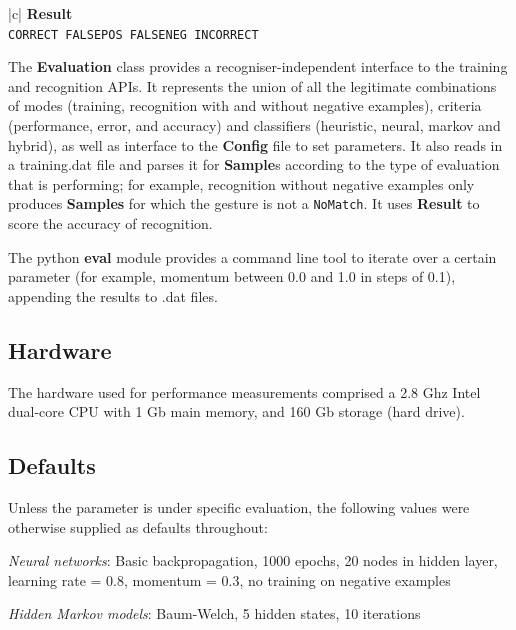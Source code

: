 \documentclass[12pt,a4,notitlepage]{report}
\renewcommand{\_}{\texttt{\symbol{95}}}
\newcommand{\<}{\texttt{\symbol{60}}}
\renewcommand{\>}{\texttt{\symbol{62}}}
\newcommand{\class}[1]{\textbf{#1}}
\newcommand{\variable}[1]{\texttt{#1}}
\begin{document}
\begin{tabular}{|c|} \hline 
\class{Result} \\ \hline
{}
{\variable{CORRECT \newline
FALSE\_POS \newline
FALSE\_NEG \newline
INCORRECT
} } \\ \hline
\end{tabular}

The \class{Evaluation} class provides a recogniser-independent interface to the training and recognition APIs. It represents the union of all the legitimate combinations of modes (training, recognition with and without negative examples), criteria (performance, error, and accuracy) and classifiers (heuristic, neural, markov and hybrid), as well as interface to the \class{Config} file to set parameters. It also reads in a training.dat file and parses it for \class{Sample}s according to the type of evaluation that is performing; for example, recognition without negative examples only produces \class{Samples} for which the gesture is not a \variable{NoMatch}. It uses \class{Result} to score the accuracy of recognition.

The python \class{eval} module provides a command line tool to iterate over a certain parameter (for example, momentum between 0.0 and 1.0 in steps of 0.1), appending the results to .dat files.

\subsection{Hardware}

The hardware used for performance measurements comprised a 2.8 Ghz Intel
dual-core CPU with 1 Gb main memory, and 160 Gb storage (hard drive).

\subsection{Defaults}

Unless the parameter is under specific evaluation, the following values were otherwise supplied as defaults throughout:

\textit{Neural networks}: Basic backpropagation, 1000 epochs, 20 nodes in hidden layer, learning rate = 0.8, momentum = 0.3, no training on negative examples

\textit{Hidden Markov models}: Baum-Welch, 5 hidden states, 10 iterations
\end{document}
